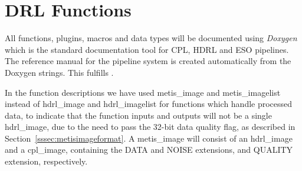 \clearpage
\section{DRL Functions}\label{sec:drl_functions}


All functions, plugins, macros and data types will be documented using
\emph{Doxygen} which is the standard documentation tool for CPL, HDRL and ESO
pipelines. The reference manual for the pipeline system is created automatically
from the Doxygen strings. This fulfills .

In the function descriptions we have used metis\_image and
metis\_imagelist instead of hdrl\_image and hdrl\_imagelist for functions which handle
processed data, to
indicate that the function inputs and outputs will not be a single
hdrl\_image, due to the need to pass the 32-bit data quality flag, as
described in Section~\ref{sssec:metisimageformat}.  A metis\_image will
consist of an hdrl\_image and a cpl\_image, containing the DATA and
NOISE extensions, and QUALITY extension, respectively.











